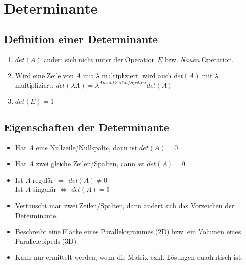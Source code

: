 \section{Determinante}

\subsection{Definition einer Determinante}
	\begin{enumerate}
		\item $det(A)$ ändert sich nicht unter der Operation $E$ bzw. \textit{blauen} Operation.
		\item Wird eine Zeile von $A$ mit $\lambda$ multipliziert, wird auch $det(A)$ mit $\lambda$ multipliziert: $det(\lambda A)=\lambda^{Anzahl Zeilen/Spalten}det(A)$
		\item $det(E) = 1$
	\end{enumerate}

\subsection{Eigenschaften der Determinante}
	\begin{itemize}
		\item Hat $A$ eine Nullzeile/Nullspalte, dann ist $det(A) = 0$
		\item Hat $A$ \underline{zwei gleiche} Zeilen/Spalten, dann ist $det(A) = 0$
		\item Ist $A$ regulär $\Leftrightarrow$ $det(A) \neq 0$ \\
			Ist $A$ singulär $\Leftrightarrow$ $det(A) = 0$
		\item Vertauscht man zwei Zeilen/Spalten, dann ändert sich das Vorzeichen der Determinante.
		\item Beschreibt eine Fläche eines Parallelogrammes (2D) bzw. ein Volumen eines Parallelepipeds (3D).
		\item Kann nur ermittelt werden, wenn die Matrix exkl. Lösungen quadratisch ist.
	\end{itemize}

